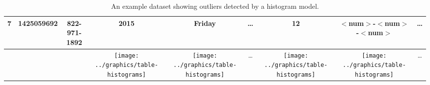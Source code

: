 \begin{table*}[t]
\begin{center}
\begin{tabular}{|c|c|c||c|c|c||c|c|c|}
7 & 1425059692 & 822-971-1892 & 2015 & Friday &\ldots& 12 & $<$num$>$-$<$num$>$-$<$num$>$ &  \ldots\\ \hline
  &            &              & \texttt{[image: ../graphics/table-histograms]} & \texttt{[image: ../graphics/table-histograms]} & \ldots & \texttt{[image: ../graphics/table-histograms]} & \texttt{[image: ../graphics/table-histograms]} & \ldots
\end{tabular}
\end{center}

\caption{An example dataset showing outliers detected by a histogram model.}
\label{tab:example}
\end{table*}

